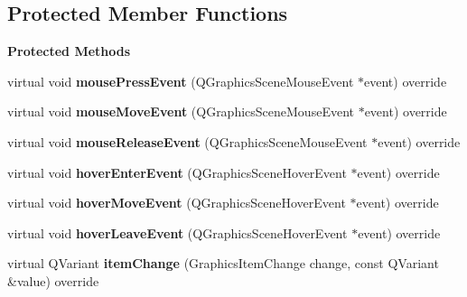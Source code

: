 \subsection*{Protected Member Functions}
\begin{Indent}\textbf{ Protected Methods}\par
\begin{DoxyCompactItemize}
\item 
\mbox{\label{classrev_1_1_view_1_1_timeline_indicator_a9f2b4875ae1981ee6079728ee4cfd58e}} 
virtual void {\bfseries mouse\+Press\+Event} (Q\+Graphics\+Scene\+Mouse\+Event $\ast$event) override
\item 
\mbox{\label{classrev_1_1_view_1_1_timeline_indicator_a88a713f761c29eca0f454409b6990f3e}} 
virtual void {\bfseries mouse\+Move\+Event} (Q\+Graphics\+Scene\+Mouse\+Event $\ast$event) override
\item 
\mbox{\label{classrev_1_1_view_1_1_timeline_indicator_aa901da71bd1a249ac1631bf9b58035c6}} 
virtual void {\bfseries mouse\+Release\+Event} (Q\+Graphics\+Scene\+Mouse\+Event $\ast$event) override
\item 
\mbox{\label{classrev_1_1_view_1_1_timeline_indicator_a677b0dcfde9be6fa84b83db9269fff04}} 
virtual void {\bfseries hover\+Enter\+Event} (Q\+Graphics\+Scene\+Hover\+Event $\ast$event) override
\item 
\mbox{\label{classrev_1_1_view_1_1_timeline_indicator_a3b9f507f3527b2c9adfa67b34127f275}} 
virtual void {\bfseries hover\+Move\+Event} (Q\+Graphics\+Scene\+Hover\+Event $\ast$event) override
\item 
\mbox{\label{classrev_1_1_view_1_1_timeline_indicator_a44e8ddaf88065b17f917725b1d5ba4d2}} 
virtual void {\bfseries hover\+Leave\+Event} (Q\+Graphics\+Scene\+Hover\+Event $\ast$event) override
\item 
\mbox{\label{classrev_1_1_view_1_1_timeline_indicator_a9744388f702f13d0531db62e31c9563c}} 
virtual Q\+Variant {\bfseries item\+Change} (Graphics\+Item\+Change change, const Q\+Variant \&value) override
\end{DoxyCompactItemize}
\end{Indent}
